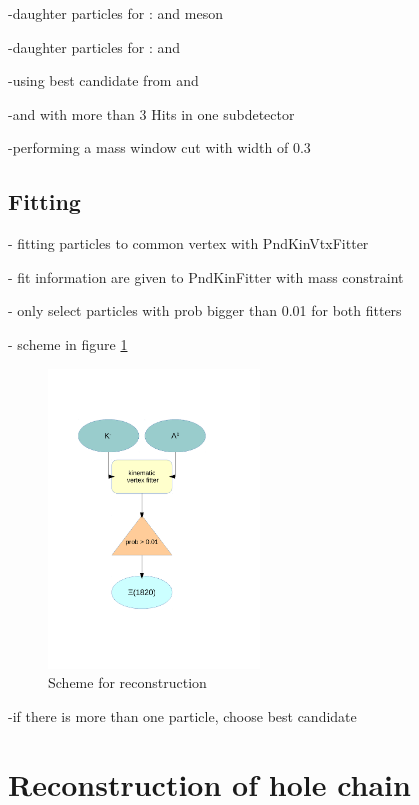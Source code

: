 		
		-daughter particles for \excitedcascade: \lam and \kminus meson
		
		-daughter particles for \excitedanticascade: \alam and \kplus 
		
		-using best candidate from \lam and \alam
		
		-\kplus and \kminus with more than 3 Hits in one subdetector 
		
		-performing a mass window cut with width of $0.3$\massunit 
		
		
	\subsection{Fitting}
	
		- fitting particles to common vertex with PndKinVtxFitter
		
		- fit information are given to PndKinFitter with mass constraint
		
		- only select particles with prob bigger than 0.01 for both fitters
		
		- scheme in figure \ref{fig:excitedcascade_scheme}
		
		\begin{figure}
			\centering
				\includegraphics[width=0.50\textwidth]{./plots/combineExcitedCascade.pdf}
			\caption{Scheme for \excitedcascade reconstruction}
			\label{fig:excitedcascade_scheme}
		\end{figure}
		
		-if there is more than one particle, choose best candidate
	
\section{Reconstruction of hole chain}


